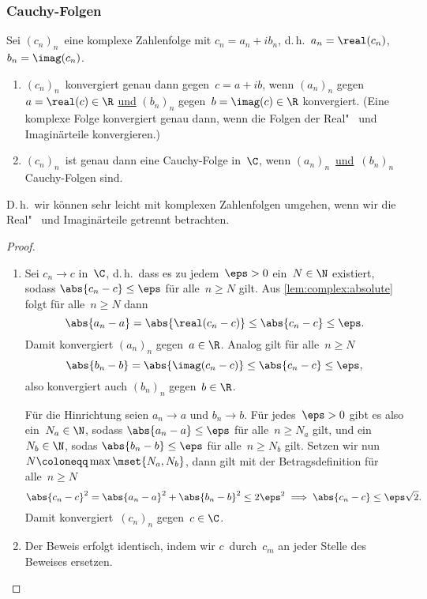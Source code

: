 \documentclass[a4paper]{article}
\begin{document}
\subsubsection{Cauchy-Folgen}

\begin{theorem}\label{thm:complex:convergence}
    Sei $(c_n)_n$~eine komplexe Zahlenfolge mit $c_n = a_n+ib_n$, d.\,h.\ $a_n = \real(c_n)$, $b_n = \imag(c_n)$.
    \begin{enumerate}
        \item $(c_n)_n$~konvergiert genau dann gegen~$c = a+ib$, wenn $(a_n)_n$ gegen~$a = \real(c) \in \R$ \underline{und} $(b_n)_n$ gegen~$b = \imag(c) \in \R$ konvergiert. (Eine komplexe Folge konvergiert genau dann, wenn die Folgen der Real"~ und Imaginärteile konvergieren.)
        \item $(c_n)_n$~ist genau dann eine Cauchy-Folge in~$\C$, wenn $(a_n)_n$~\underline{und}~$(b_n)_n$ Cauchy-Folgen sind.
    \end{enumerate}
\end{theorem}

D.\,h.\ wir können sehr leicht mit komplexen Zahlenfolgen umgehen, wenn wir die Real"~ und Imaginärteile getrennt betrachten.

\begin{proof}\leavevmode
    \begin{enumerate}
        \item Sei $c_n \to c$ in~$\C$, d.\,h.\ dass es zu jedem~$\eps > 0$ ein~$N \in \N$ existiert, sodass $\abs{c_n-c} \leq \eps$ für alle~$n \geq N$ gilt. Aus \cref{lem:complex:absolute} folgt für alle~$n \geq N$ dann
              \begin{equation*}
                  \abs{a_n-a} = \abs{\real(c_n-c)} \leq \abs{c_n-c} \leq \eps.
              \end{equation*}
              Damit konvergiert $(a_n)_n$ gegen~$a \in \R$. Analog gilt für alle~$n \geq N$
              \begin{equation*}
                  \abs{b_n-b} = \abs{\imag(c_n-c)} \leq \abs{c_n-c} \leq \eps,
              \end{equation*}
              also konvergiert auch $(b_n)_n$ gegen~$b \in \R$.

              Für die Hinrichtung seien $a_n \to a$ und $b_n \to b$. Für jedes~$\eps > 0$ gibt es also ein~$N_a \in \N$, sodass $\abs{a_n-a} \leq \eps$ für alle~$n \geq N_a$ gilt, und ein~$N_b \in \N$, sodas $\abs{b_n-b} \leq \eps$ für alle~$n \geq N_b$ gilt. Setzen wir nun $N \coloneqq \max\mset{N_a,N_b}$, dann gilt mit der Betragsdefinition für alle~$n \geq N$
              \begin{equation*}
                  \abs{c_n-c}^2 = \abs{a_n-a}^2 + \abs{b_n-b}^2 \leq 2\eps^2 \implies \abs{c_n-c} \leq \eps\sqrt{2}.
              \end{equation*}
              Damit konvergiert~$(c_n)_n$ gegen~$c \in \C$.
        \item Der Beweis erfolgt identisch, indem wir $c$~durch~$c_m$ an jeder Stelle des Beweises ersetzen.\qedhere
    \end{enumerate}
\end{proof}
\end{document}
